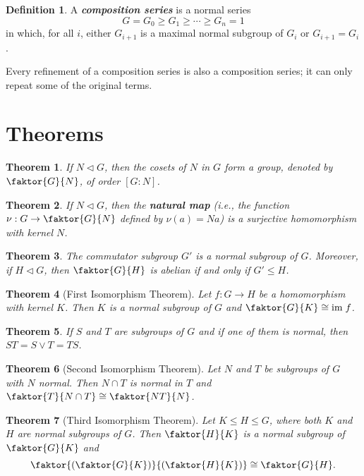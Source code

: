 \documentclass[12pt]{report}
\newtheorem{theorem}{Theorem}[chapter]
\theoremstyle{definition}
\newtheorem*{definition}{Definition}
\newcommand{\term}[1]{\textbf{\textit{#1}}}
\begin{document}
\begin{definition}
	A \term{composition series} is a normal series
	\[ G = G_0 \geq G_1 \geq \cdots \geq G_n = 1 \]
	in which, for all $i$, either $G_{i+1}$ is a maximal normal subgroup of $G_i$ or $G_{i+1}=G_i$.\\
	\par
	Every refinement of a composition series is also a composition series; it can only repeat some of the original terms.
\end{definition}



\section{Theorems}

\begin{theorem}
	If $N\vartriangleleft G$, then the cosets of $N$ in $G$ form a group, denoted by $\faktor{G}{N}$, of order $[G:N]$.
\end{theorem}

\begin{theorem}
	If $N\vartriangleleft G$, then the \term{natural map} (i.e., the function $\nu:G\to\faktor{G}{N}$ defined by $\nu(a)=Na$) is a surjective homomorphism with kernel $N$.
\end{theorem}

\begin{theorem}
	The commutator subgroup $G'$ is a normal subgroup of $G$. Moreover, if $H\vartriangleleft G$, then $\faktor{G}{H}$ is abelian if and only if $G'\leq H$.
\end{theorem}

\begin{theorem}[First Isomorphism Theorem]
	Let $f:G\to H$ be a homomorphism with kernel $K$. Then $K$ is a normal subgroup of $G$ and $\faktor{G}{K}\cong \mathrm{im}\;f$.
\end{theorem}

\begin{theorem}
	If $S$ and $T$ are subgroups of $G$ and if one of them is normal, then $ST=S\vee T=TS$.
\end{theorem}

\begin{theorem}[Second Isomorphism Theorem]
	Let $N$ and $T$ be subgroups of $G$ with $N$ normal. Then $N\cap T$ is normal in $T$ and $\faktor{T}{N\cap T}\cong\faktor{NT}{N}$.
\end{theorem}

\begin{theorem}[Third Isomorphism Theorem]
	Let $K\leq H\leq G$, where both $K$ and $H$ are normal subgroups of $G$. Then $\faktor{H}{K}$ is a normal subgroup of $\faktor{G}{K}$ and
	\[ \faktor{\left(\faktor{G}{K}\right)}{\left(\faktor{H}{K}\right)}\cong\faktor{G}{H}. \]
\end{theorem}
\end{document}

